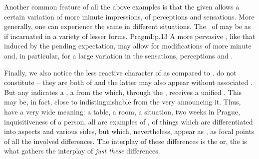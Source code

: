 Another common feature of all the above examples is that the given 
allows a certain variation of more minute impressions, of perceptions and
 sensations.  More generally, one can experience the same
 in different situations. The \oss\ of  may be as if
incarnated in a variety of lesser forms. \citet{Every one knows how when a
  painful thing has to be undergone in the near future, the vague feeling that
  it is impending penetrates all our thought with uneasiness and subtly vitiates
  our mood even when it does not control our attention; it keeps us from being
  at rest, at home in the given present.}{Pragm}{I;p.13} A more pervasive
, like that induced by the pending expectation, may allow for
modifications of more minute  and, in particular, for a large
variation in the sensations, perceptions and .

Finally, we also notice the less reactive character of  as
compared to .   do not constitute
 -- they are both  of  and the latter
may also appear without associated . But any 
indicates a , a  from the  which, through the
, receives a unified . This  may be, in
fact, close to indistinguishable from the very  announcing it.
Thus,  have a very wide meaning: a table, a room, a situation, two
weeks in Prague, inquisitiveness of a person, all are examples of
, of things which are differentiated into aspects and various
sides, but which, nevertheless, appear as , as focal points of
all the involved differences. The interplay of these differences is the
 or, the  is what gathers the interplay of {\em just these}
differences.


